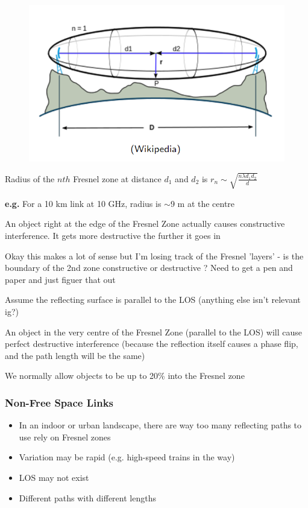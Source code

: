 \documentclass[12pt]{article}
\begin{document}
\begin{figure}[h!]
    \centering
    \includegraphics[width=0.5\linewidth]{images/image6.png}
\end{figure}

Radius of the $nth$ Fresnel zone at distance $d_1$ and $d_2$ is $r_n \sim \sqrt{\frac{n\lambda d_1 d_2}{d}}$

\textbf{e.g.} For a 10 km link at 10 GHz, radius is $\sim$9 m at the centre

An object right at the edge of the Fresnel Zone actually causes constructive interference. It gets more destructive the further it goes in

Okay this makes a lot of sense but I'm losing track of the Fresnel 'layers' - is the boundary of the 2nd zone constructive or destructive ? Need to get a pen and paper and just figuer that out

Assume the reflecting surface is parallel to the LOS (anything else isn't relevant ig?)

An object in the very centre of the Fresnel Zone (parallel to the LOS) will cause perfect destructive interference (because the reflection itself causes a phase flip, and the path length will be the same)

We normally allow objects to be up to 20\% into the Fresnel zone

\subsubsection{Non-Free Space Links}

\begin{itemize}[noitemsep]
    \item In an indoor or urban landscape, there are way too many reflecting paths to use rely on Fresnel zones
    \item Variation may be rapid (e.g. high-speed trains in the way)
    \item LOS may not exist
    \item Different paths with different lengths
\end{itemize}
\end{document}
